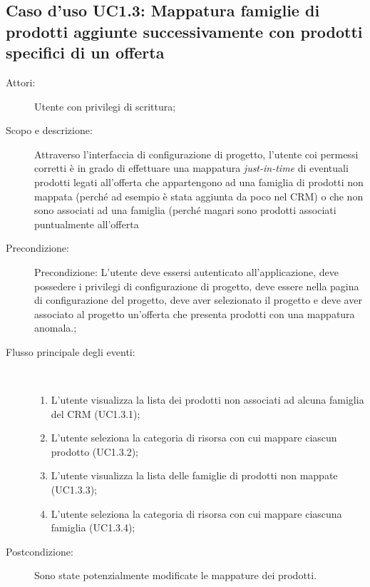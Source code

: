 \documentclass[12pt,a4paper,twoside,openright,english]{book}
\begin{document}
\subsection{Caso d'uso UC1.3: Mappatura famiglie di prodotti aggiunte successivamente con prodotti specifici di un offerta}\begin{description}
	\item[Attori:] Utente con privilegi di scrittura;
	\item[Scopo e descrizione:] Attraverso l’interfaccia di configurazione di progetto, l’utente coi permessi corretti è in grado di effettuare una mappatura \textit{just-in-time} di eventuali prodotti legati all’offerta che appartengono ad una famiglia di prodotti non mappata (perché ad esempio è stata aggiunta da poco nel CRM) o che non sono associati ad una famiglia (perché magari sono prodotti associati puntualmente all’offerta
	\item[Precondizione:] Precondizione: L’utente deve essersi autenticato all’applicazione, deve possedere i privilegi di configurazione di progetto, deve essere nella pagina di configurazione del progetto, deve aver selezionato il progetto e deve aver associato al progetto un’offerta che presenta prodotti con una mappatura anomala.;
	
	\item[Flusso principale degli eventi:] \ 
	\begin{enumerate}
		\item L’utente visualizza la lista dei prodotti non associati ad alcuna famiglia del CRM  (UC1.3.1);
		\item L’utente seleziona la categoria di risorsa con cui mappare ciascun prodotto  (UC1.3.2);
		\item L’utente visualizza la lista delle famiglie di prodotti non mappate  (UC1.3.3);
		\item L’utente seleziona la categoria di risorsa con cui mappare ciascuna famiglia  (UC1.3.4);
		
	\end{enumerate}
	\item[Postcondizione:] Sono state potenzialmente modificate le mappature dei prodotti.
\end{description}

\hypertarget{UC2}{}
\end{document}
